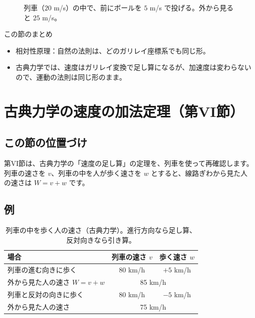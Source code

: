 \documentclass[a4paper,11pt,openany]{ltjsbook}
\begin{document}
\begin{figure}[htbp]
\centering
{}
\caption{列車（$20$ m/s）の中で、前にボールを $5$ m/s で投げる。外から見ると $25$ m/s。}
\end{figure}

\begin{pointbox}{この節のまとめ}
\begin{itemize}[leftmargin=*]
\item 相対性原理：自然の法則は、どのガリレイ座標系でも同じ形。
\item 古典力学では、速度はガリレイ変換で足し算になるが、加速度は変わらないので、運動の法則は同じ形のまま。
\end{itemize}
\end{pointbox}

\chapter{古典力学の速度の加法定理（第VI節）}

\section{この節の位置づけ}

第VI節は、古典力学の「速度の足し算」の定理を、列車を使って再確認します。列車の速さを $v$、列車の中を人が歩く速さを $w$ とすると、線路ぎわから見た人の速さは $W=v+w$ です。

\section{例}

\begin{table}[htbp]
\centering
\begin{tabular}{lcc}
\toprule
場合 & 列車の速さ $v$ & 歩く速さ $w$\\
\midrule
列車の進む向きに歩く & 80 km/h & $+5$ km/h\\
外から見た人の速さ $W=v+w$ & \multicolumn{2}{c}{85 km/h}\\
列車と反対の向きに歩く & 80 km/h & $-5$ km/h\\
外から見た人の速さ & \multicolumn{2}{c}{75 km/h}\\
\bottomrule
\end{tabular}
\caption{列車の中を歩く人の速さ（古典力学）。進行方向なら足し算、反対向きなら引き算。}
\end{table}
\end{document}
